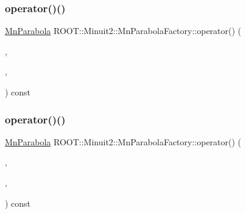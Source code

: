 \subsubsection{\texorpdfstring{operator()()}{operator()()}\hspace{0.1cm}{\footnotesize\ttfamily [2/4]}}
{\footnotesize\ttfamily \mbox{\hyperlink{classROOT_1_1Minuit2_1_1MnParabola}{Mn\+Parabola}} R\+O\+O\+T\+::\+Minuit2\+::\+Mn\+Parabola\+Factory\+::operator() (\begin{DoxyParamCaption}\item[{const \mbox{\hyperlink{classROOT_1_1Minuit2_1_1MnParabolaPoint}{Mn\+Parabola\+Point}} \&}]{,  }\item[{const \mbox{\hyperlink{classROOT_1_1Minuit2_1_1MnParabolaPoint}{Mn\+Parabola\+Point}} \&}]{,  }\item[{const \mbox{\hyperlink{classROOT_1_1Minuit2_1_1MnParabolaPoint}{Mn\+Parabola\+Point}} \&}]{ }\end{DoxyParamCaption}) const}

\mbox{\label{classROOT_1_1Minuit2_1_1MnParabolaFactory_ab4b6a74b071f4d780dbf6b4663c188b3}} 
\subsubsection{\texorpdfstring{operator()()}{operator()()}\hspace{0.1cm}{\footnotesize\ttfamily [3/4]}}
{\footnotesize\ttfamily \mbox{\hyperlink{classROOT_1_1Minuit2_1_1MnParabola}{Mn\+Parabola}} R\+O\+O\+T\+::\+Minuit2\+::\+Mn\+Parabola\+Factory\+::operator() (\begin{DoxyParamCaption}\item[{const \mbox{\hyperlink{classROOT_1_1Minuit2_1_1MnParabolaPoint}{Mn\+Parabola\+Point}} \&}]{,  }\item[{double}]{,  }\item[{const \mbox{\hyperlink{classROOT_1_1Minuit2_1_1MnParabolaPoint}{Mn\+Parabola\+Point}} \&}]{ }\end{DoxyParamCaption}) const}

\mbox{\label{classROOT_1_1Minuit2_1_1MnParabolaFactory_ab4b6a74b071f4d780dbf6b4663c188b3}} 
